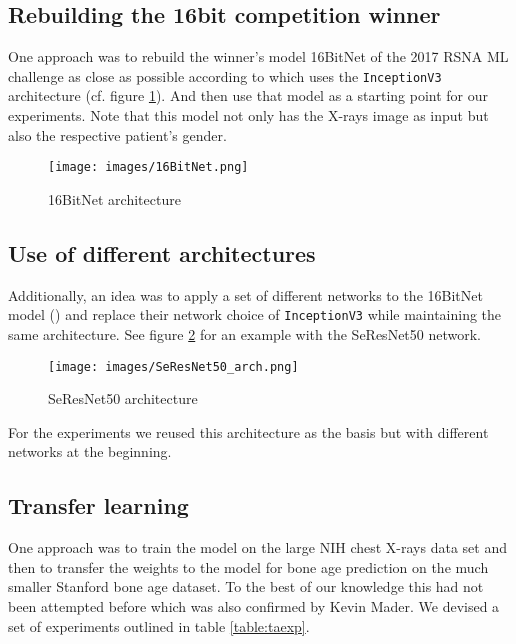 \documentclass[10pt,twocolumn,letterpaper]{article}
\begin{document}
\subsection{Rebuilding the 16bit competition winner}
One approach was to rebuild the winner's model 16BitNet of the 2017 RSNA ML challenge as close as possible according to \cite{16bitrsnachallenge} which uses the \verb+InceptionV3+ architecture (cf. figure \ref{fig:16bitnet}). And then use that model as a starting point for our experiments. Note that this model not only has the X-rays image as input but also the respective patient's gender.

\begin{figure}[h]
\texttt{[image: images/16BitNet.png]}
\centering
\caption{16BitNet architecture}
\label{fig:16bitnet}
\end{figure}

\subsection{Use of different architectures}
Additionally, an idea was to apply a set of different networks to the 16BitNet model (\cite{16bitrsnachallenge}) and replace their network choice of \verb+InceptionV3+ while maintaining the same architecture. See figure \ref{fig:SeResNet50} for an example with the SeResNet50 network.

\begin{figure}[h]
\texttt{[image: images/SeResNet50\_arch.png]}
\centering
\caption{SeResNet50 architecture}
\label{fig:SeResNet50}
\end{figure}

For the experiments we reused this architecture as the basis but with different networks at the beginning.

\subsection{Transfer learning}
One approach was to train the model on the large NIH chest X-rays data set and then to transfer the weights to the model for bone age prediction on the much smaller Stanford bone age dataset. 
To the best of our knowledge this had not been attempted before which was also confirmed by Kevin Mader. We devised a set of experiments outlined in table \ref{table:taexp}.
\end{document}

